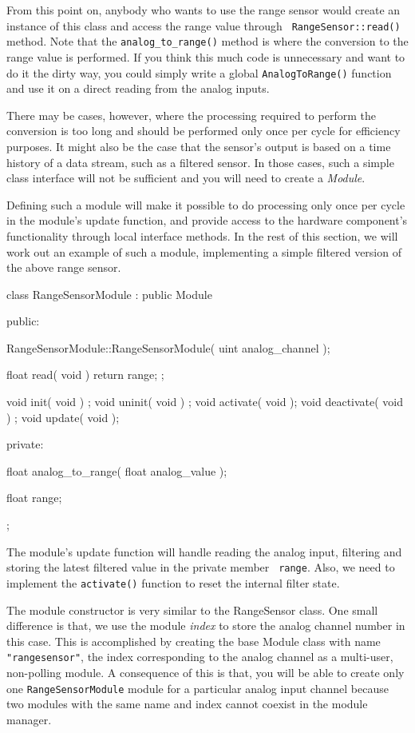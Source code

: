 From this point on, anybody who wants to use the range sensor would create
an instance of this class and access the range value through {\tt
  RangeSensor::read()} method. Note that the {\tt analog\_to\_range()} method
is where the conversion to the range value is performed. If you think this
much code is unnecessary and want to do it the dirty way, you could simply
write a global {\tt AnalogToRange()} function and use it on a direct reading
from the analog inputs.

There may be cases, however, where the processing required to perform the
conversion is too long and should be performed only once per cycle for
efficiency purposes. It might also be the case that the sensor's output is
based on a time history of a data stream, such as a filtered sensor. In
those cases, such a simple class interface will not be sufficient and you
will need to create a {\em Module}.

Defining such a module will make it possible to do processing only once per
cycle in the module's update function, and provide access to the hardware
component's functionality through local interface methods. In the rest of
this section, we will work out an example of such a module, implementing a
simple filtered version of the above range sensor.

\begin{classdef}
class RangeSensorModule : public Module {
  public:

    RangeSensorModule::RangeSensorModule( uint analog_channel );

    float read( void ) { return range; };

    void init( void ) { };
    void uninit( void ) { };
    void activate( void );
    void deactivate( void ) { };
    void update( void );

  private:

    float analog_to_range( float analog_value );

    float range;
};
\end{classdef}

The module's update function will handle reading the analog input, filtering
and storing the latest filtered value in the private member {\tt
  range}. Also, we need to implement the {\tt activate()} function to reset
the internal filter state.

The module constructor is very similar to the RangeSensor class. One small
difference is that, we use the module {\em index} to store the analog
channel number in this case. This is accomplished by creating the base
Module class with name {\tt "rangesensor"}, the index corresponding to the
analog channel as a multi-user, non-polling module. A consequence of this is
that, you will be able to create only one {\tt RangeSensorModule} module for
a particular analog input channel because two modules with the same name and
index cannot coexist in the module manager.

